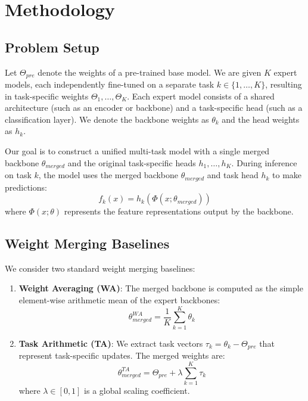 \documentclass{article}
\theoremstyle{plain}
\theoremstyle{definition}
\theoremstyle{remark}
\begin{document}
\section{Methodology}
\label{sec:method}

\subsection{Problem Setup}
Let $\Theta_{pre}$ denote the weights of a pre-trained base model. We are given $K$ expert models, each independently fine-tuned on a separate task $k \in \{1, \dots, K\}$, resulting in task-specific weights $\Theta_1, \dots, \Theta_K$. Each expert model consists of a shared architecture (such as an encoder or backbone) and a task-specific head (such as a classification layer). We denote the backbone weights as $\theta_k$ and the head weights as $h_k$.

Our goal is to construct a unified multi-task model with a single merged backbone $\theta_{merged}$ and the original task-specific heads $h_1, \dots, h_K$. During inference on task $k$, the model uses the merged backbone $\theta_{merged}$ and task head $h_k$ to make predictions:
\begin{equation}
f_k(x) = h_k(\Phi(x; \theta_{merged}))
\end{equation}
where $\Phi(x; \theta)$ represents the feature representations output by the backbone.

\subsection{Weight Merging Baselines}
We consider two standard weight merging baselines:
\begin{enumerate}
    \item \textbf{Weight Averaging (WA)}: The merged backbone is computed as the simple element-wise arithmetic mean of the expert backbones:
    \begin{equation}
    \theta_{merged}^{WA} = \frac{1}{K} \sum_{k=1}^K \theta_k
    \end{equation}
    \item \textbf{Task Arithmetic (TA)}: We extract task vectors $\tau_k = \theta_k - \Theta_{pre}$ that represent task-specific updates. The merged weights are:
    \begin{equation}
    \theta_{merged}^{TA} = \Theta_{pre} + \lambda \sum_{k=1}^K \tau_k
    \end{equation}
    where $\lambda \in [0, 1]$ is a global scaling coefficient.
\end{enumerate}
\end{document}

